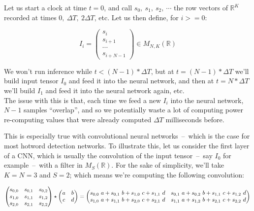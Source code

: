 \documentclass[11pt]{article}
\begin{document}
Let us start a clock at time $t = 0$, and call $s_0,\ s_1,\ s_2,\ \cdots$ the row vectors of $\mathbb{R}^K$ recorded at times $0,\ \Delta T,\ 2\Delta T$, etc. Let us then define, for $i >= 0$:

$$I_i =
\begin{pmatrix}
    s_i \\
    s_{i + 1} \\
    \cdots \\
    s_{i + N - 1}
\end{pmatrix} \in M_{N, K}(\mathbb{R})
$$

\vspace{.6em}
We won't run inference while $t < (N - 1) * \Delta T$, but at $t = (N - 1) * \Delta T$ we'll build input tensor $I_0$ and feed it into the neural network, and then at $t = N * \Delta T$ we'll build $I_1$ and feed it into the neural network again, etc.\\

The issue with this is that, each time we feed a new $I_i$ into the neural network, $N - 1$ samples ``overlap'', and so we potentially waste a lot of computing power re-computing values that were already computed $\Delta T$ milliseconds before. 

This is especially true with convolutional neural networks~--~which is the case for most hotword detection networks. To illustrate this, let us consider the first layer of a CNN, which is usually the convolution of the input tensor~--~say $I_0$ for example~--~with a filter in $M_S(\mathbb{R})$. For the sake of simplicity, we'll take $K = N = 3$ and $S = 2$; which means we're computing the following convolution:

$$
\begin{pmatrix} 
s_{0,0} & s_{0,1} & s_{0,2} \\
s_{1,0} & s_{1,1} & s_{1,2} \\
s_{2,0} & s_{2,1} & s_{2,2} \\
\end{pmatrix}
\star
\begin{pmatrix} 
a & b \\
c & d 
\end{pmatrix}
=
\begin{pmatrix} 
s_{0,0} \ a + s_{0,1} \ b + s_{1,0} \ c + s_{1,1} \ d &
s_{0,1} \ a + s_{0,2} \ b + s_{1,1} \ c + s_{1,2} \ d \\
s_{1,0} \ a + s_{1,1} \ b + s_{2,0} \ c + s_{2,1} \ d &
s_{1,1} \ a + s_{1,2} \ b + s_{2,1} \ c + s_{2,2} \ d
\end{pmatrix}\\
$$
\vspace{.5em}
\end{document}
